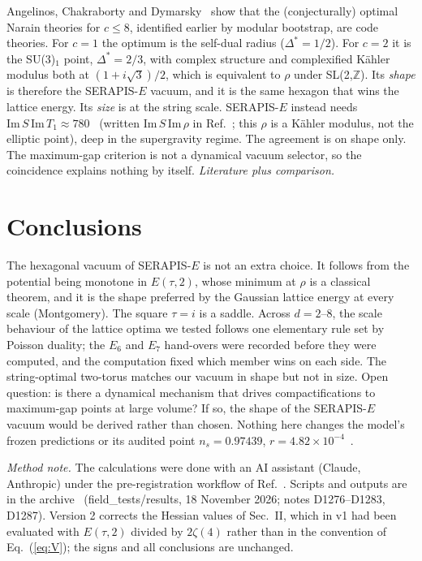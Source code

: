 \documentclass[aps,prd,twocolumn,superscriptaddress,nofootinbib,showkeys]{revtex4-2}
\begin{document}
Angelinos, Chakraborty and Dymarsky~\cite{ACD} show that the (conjecturally) optimal Narain theories for $c\le8$, identified earlier by modular bootstrap, are code theories. For $c=1$ the optimum is the self-dual radius ($\Delta^*=1/2$). For $c=2$ it is the SU(3)$_1$ point, $\Delta^*=2/3$, with complex structure and complexified K\"ahler modulus both at $(1+i\sqrt3)/2$, which is equivalent to $\rho$ under SL(2,$\mathbb Z$). Its \emph{shape} is therefore the SERAPIS-$E$ vacuum, and it is the same hexagon that wins the lattice energy. Its \emph{size} is at the string scale. SERAPIS-$E$ instead needs $\mathrm{Im}\,S\,\mathrm{Im}\,T_1\approx780$~\cite{P3,P5} (written $\mathrm{Im}\,S\,\mathrm{Im}\,\rho$ in Ref.~\cite{P5}; this $\rho$ is a K\"ahler modulus, not the elliptic point), deep in the supergravity regime. The agreement is on shape only. The maximum-gap criterion is not a dynamical vacuum selector, so the coincidence explains nothing by itself. \emph{Literature plus comparison.}

\section{Conclusions}
The hexagonal vacuum of SERAPIS-$E$ is not an extra choice. It follows from the potential being monotone in $E(\tau,2)$, whose minimum at $\rho$ is a classical theorem, and it is the shape preferred by the Gaussian lattice energy at every scale (Montgomery). The square $\tau=i$ is a saddle. Across $d=2$--8, the scale behaviour of the lattice optima we tested follows one elementary rule set by Poisson duality; the $E_6$ and $E_7$ hand-overs were recorded before they were computed, and the computation fixed which member wins on each side. The string-optimal two-torus matches our vacuum in shape but not in size. Open question: is there a dynamical mechanism that drives compactifications to maximum-gap points at large volume? If so, the shape of the SERAPIS-$E$ vacuum would be derived rather than chosen. Nothing here changes the model's frozen predictions or its audited point $n_s=0.97439$, $r=4.82\times10^{-4}$~\cite{P5}.

\emph{Method note.} The calculations were done with an AI assistant (Claude, Anthropic) under the pre-registration workflow of Ref.~\cite{P4}. Scripts and outputs are in the archive~\cite{AEGIS} (field\_tests/results, 18 November 2026; notes D1276--D1283, D1287). Version 2 corrects the Hessian values of Sec.~II, which in v1 had been evaluated with $E(\tau,2)$ divided by $2\zeta(4)$ rather than in the convention of Eq.~(\ref{eq:V}); the signs and all conclusions are unchanged.
\end{document}
